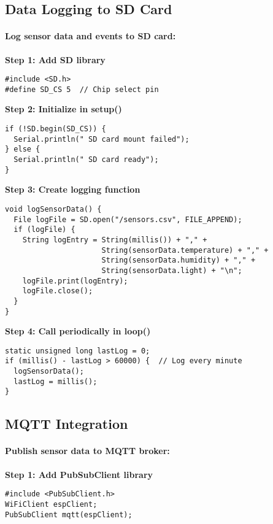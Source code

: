 \documentclass[11pt,a4paper]{article}
\begin{document}
\subsection{Data Logging to SD Card}

\paragraph{Log sensor data and events to SD card:}

\textbf{Step 1: Add SD library}
\begin{verbatim}
#include <SD.h>
#define SD_CS 5  // Chip select pin
\end{verbatim}

\textbf{Step 2: Initialize in setup()}
\begin{verbatim}
if (!SD.begin(SD_CS)) {
  Serial.println(" SD card mount failed");
} else {
  Serial.println(" SD card ready");
}
\end{verbatim}

\textbf{Step 3: Create logging function}
\begin{verbatim}
void logSensorData() {
  File logFile = SD.open("/sensors.csv", FILE_APPEND);
  if (logFile) {
    String logEntry = String(millis()) + "," +
                      String(sensorData.temperature) + "," +
                      String(sensorData.humidity) + "," +
                      String(sensorData.light) + "\n";
    logFile.print(logEntry);
    logFile.close();
  }
}
\end{verbatim}

\textbf{Step 4: Call periodically in loop()}
\begin{verbatim}
static unsigned long lastLog = 0;
if (millis() - lastLog > 60000) {  // Log every minute
  logSensorData();
  lastLog = millis();
}
\end{verbatim}

\subsection{MQTT Integration}

\paragraph{Publish sensor data to MQTT broker:}

\textbf{Step 1: Add PubSubClient library}
\begin{verbatim}
#include <PubSubClient.h>
WiFiClient espClient;
PubSubClient mqtt(espClient);
\end{verbatim}
\end{document}
